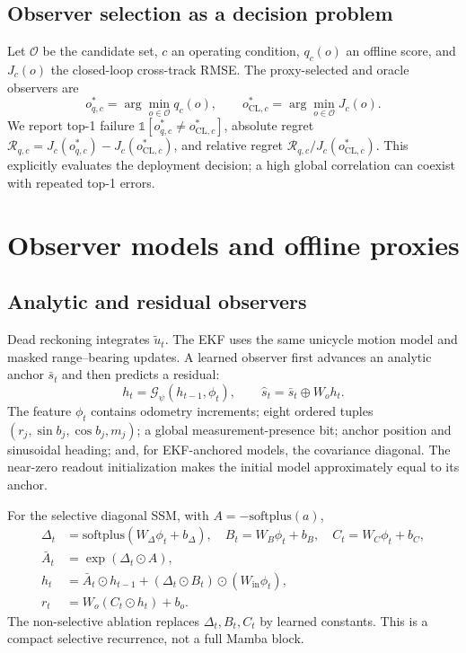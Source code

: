 \documentclass{article}
\newcommand{\CL}{\mathrm{CL}}
\begin{document}
\subsection{Observer selection as a decision problem}
Let $\mathcal O$ be the candidate set, $c$ an operating condition, $q_c(o)$ an offline score, and $J_c(o)$ the closed-loop cross-track RMSE. The proxy-selected and oracle observers are
\begin{equation}
 o^*_{q,c}=\arg\min_{o\in\mathcal O} q_c(o),\qquad
 o^*_{\CL,c}=\arg\min_{o\in\mathcal O} J_c(o).
\end{equation}
We report top-1 failure $\mathbb{1}[o^*_{q,c}\neq o^*_{\CL,c}]$, absolute regret
$\mathcal R_{q,c}=J_c(o^*_{q,c})-J_c(o^*_{\CL,c})$, and relative regret $\mathcal R_{q,c}/J_c(o^*_{\CL,c})$. This explicitly evaluates the deployment decision; a high global correlation can coexist with repeated top-1 errors.

\section{Observer models and offline proxies}
\subsection{Analytic and residual observers}
Dead reckoning integrates $\tilde u_t$. The EKF uses the same unicycle motion model and masked range--bearing updates. A learned observer first advances an analytic anchor $\bar s_t$ and then predicts a residual:
\begin{equation}
 h_t=\mathcal G_\psi(h_{t-1},\phi_t),\qquad
 \hat s_t=\bar s_t\oplus W_o h_t.
\end{equation}
The feature $\phi_t$ contains odometry increments; eight ordered tuples $(r_j,\sin b_j,\cos b_j,m_j)$; a global measurement-presence bit; anchor position and sinusoidal heading; and, for EKF-anchored models, the covariance diagonal. The near-zero readout initialization makes the initial model approximately equal to its anchor.

For the selective diagonal SSM, with $A=-\mathrm{softplus}(a)$,
\begin{equation}
\begin{aligned}
\Delta_t&=\mathrm{softplus}(W_\Delta\phi_t+b_\Delta),\quad
B_t=W_B\phi_t+b_B,\quad C_t=W_C\phi_t+b_C,\\
\bar A_t&=\exp(\Delta_t\odot A),\\
h_t&=\bar A_t\odot h_{t-1}+(\Delta_t\odot B_t)\odot(W_{\mathrm{in}}\phi_t),\\
r_t&=W_o(C_t\odot h_t)+b_o.
\end{aligned}
\end{equation}
The non-selective ablation replaces $\Delta_t,B_t,C_t$ by learned constants. This is a compact selective recurrence, not a full Mamba block.
\end{document}
